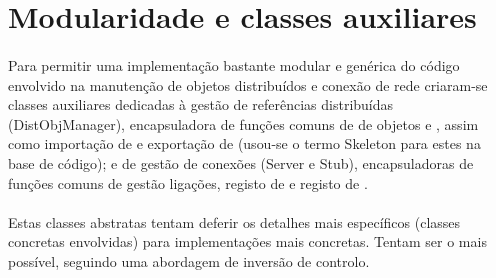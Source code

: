 \documentclass[11pt,a4paper]{report}
\begin{document}
\section{Modularidade e classes auxiliares}

\paragraph{} Para permitir uma implementação bastante modular e genérica do código envolvido na manutenção de objetos distribuídos e conexão de rede criaram-se classes auxiliares dedicadas à gestão de referências distribuídas (DistObjManager), encapsuladora de funções comuns de  de objetos e , assim como importação de  e exportação de  (usou-se o termo Skeleton para estes na base de código); e de gestão de conexões (Server e Stub), encapsuladoras de funções comuns de gestão ligações, registo de  e registo de .

\paragraph{} Estas classes abstratas tentam deferir os detalhes mais específicos (classes concretas envolvidas) para implementações mais concretas. Tentam ser o mais  possível, seguindo uma abordagem de inversão de controlo.
\end{document}
